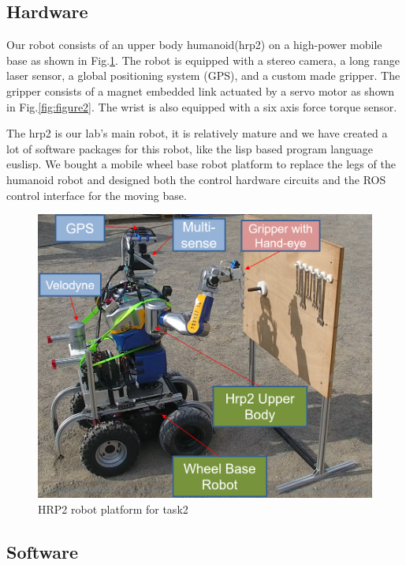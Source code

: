 \documentclass{standalone}
\begin{document}
\subsection{Hardware}
Our robot consists of an upper body humanoid(hrp2) on a high-power mobile base as shown in Fig.\ref{fig:figure1}. The robot is equipped with a stereo camera, a long range laser sensor, a global positioning system (GPS), and a custom made gripper. The gripper consists of a magnet embedded link actuated by a servo motor as shown in Fig.\ref{fig:figure2}. The wrist is also equipped with a six axis force torque sensor.

The hrp2 is our lab's main robot, it is relatively mature and we have created a lot of software packages for this robot, like the lisp based program language euslisp. %
We bought a mobile wheel base robot platform to replace the legs of the humanoid robot and designed both the control hardware circuits and the ROS control interface for the moving base.


\begin{figure}[t]
  \includegraphics[width=\columnwidth]{sections/task2/images/hrp2.png}
  \caption{HRP2 robot platform for task2}
  \label{fig:figure1}
\end{figure}

\subsection{Software}
\end{document}
